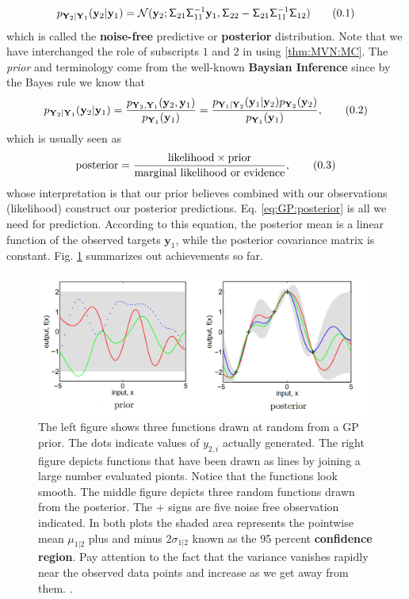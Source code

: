 \documentclass[10pt]{article}
\theoremstyle{definition}
\theoremstyle{definition}
\theoremstyle{remark}
\newcommand\eqnum{\addtocounter{equation}{1}\tag{\arabic{section}.\arabic{equation}}}
\begin{document}
\begin{equation*}
p_{\mathbf{Y}_2|\mathbf{Y}_1}(\mathbf{y}_2|\mathbf{y}_1) = 
\mathcal{N}(\mathbf{y}_2;\mathsf{\Sigma}_{21}\mathsf{\Sigma}_{11}^{-1}\mathbf{y}_1, \mathsf{\Sigma}_{22} - 
\mathsf{\Sigma}_{21} \mathsf{\Sigma}_{11}^{-1} \mathsf{\Sigma}_{12})
\eqnum
\label{eq:GP:posterior}
\end{equation*}
which is called the \textbf{noise-free} predictive or \textbf{posterior} distribution. Note that we have interchanged the role of subscripts $1$ and $2$ in using \cref{thm:MVN:MC}. The \textit{prior} and  terminology come from the well-known \textbf{Baysian Inference} since by the Bayes rule we know that
\begin{equation*}
p_{\mathbf{Y}_2|\mathbf{Y}_1}(\mathbf{y}_2|\mathbf{y}_1) =
\frac{p_{\mathbf{Y}_2,\mathbf{Y}_1}(\mathbf{y}_2,\mathbf{y}_1)}{p_{\mathbf{Y}_1}(\mathbf{y}_1)} = 
\frac{p_{\mathbf{Y}_1|\mathbf{Y}_2}(\mathbf{y}_1|\mathbf{y}_2)p_{\mathbf{Y}_2}(\mathbf{y}_2)}{p_{\mathbf{Y}_1}(\mathbf{y}_1)},
\eqnum
\end{equation*}
which is usually seen as
\begin{equation*}
\text{posterior} = \frac{\text{likelihood} \times \text{prior}}{\text{marginal likelihood or evidence}},
\eqnum
\end{equation*}
whose interpretation is that our prior believes combined with our observations (likelihood) construct our posterior predictions. Eq. \eqref{eq:GP:posterior} is all we need for prediction. According to this equation, the posterior mean is a linear function of the observed targets $\mathbf{y}_1$, while the posterior covariance matrix is constant. Fig. \ref{fig:prior:posterior} summarizes out achievements so far.
\begin{figure}[t!]
\centering
\includegraphics[width=12cm]{figs/prior-posterior.png}
\caption{The left figure shows three functions drawn at random from a GP prior. The dots indicate values of $y_{2,i}$ actually generated. The right figure depicts functions that have been drawn as lines by joining a large number evaluated pionts. Notice that the functions look smooth. The middle figure depicts three random functions drawn from the posterior. The + signs are five noise free observation indicated. In both plots the shaded area represents the pointwise mean $\mu_{1|2}$ plus and minus $2\sigma_{1|2}$ known as the 95 percent \textbf{confidence region}. Pay attention to the fact that the variance vanishes rapidly near the observed data points and increase as we get away from them. \cite{Rasmussen2006}.}
\label{fig:prior:posterior}
\end{figure}
\end{document}
